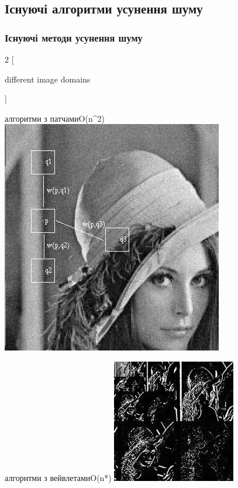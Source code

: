 \documentclass[12pt]{beamer}
\begin{document}
\subsection{Існуючі алгоритми усунення шуму}
\begin{frame}\frametitle{Існуючі методи усунення шуму}	
	\begin{multicols}{2}
		[
		\begin{center} different image domains \end{center}
		]
		
		алгоритми з патчами\linebreak O(n^{2}) \linebreak
		\includegraphics[scale=0.35]{images/patch}
		
		\columnbreak
		
		алгоритми з вейвлетами\linebreak O(n*) \linebreak
		\includegraphics[scale=0.65]{images/dwt}
	\end{multicols}
	
\end{frame}
\end{document}
